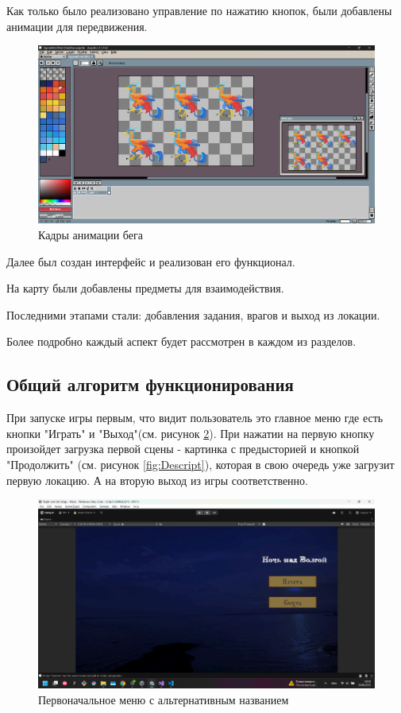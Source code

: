 \documentclass[bachelor, och, coursework, times]{SCWorks}
\begin{document}
    Как только было реализовано управление по нажатию кнопок, были добавлены 
    анимации для передвижения.

    \begin{figure} [H]
        \centering
    \includegraphics[width=0.50\linewidth]{Pictures/Снимок экрана 2025-06-24 162629.png}
    \caption{Кадры анимации бега}
    \label{fig:Run}
    \end{figure}
    
    Далее был создан интерфейс и реализован его функционал. 

    На карту были добавлены предметы для взаимодействия. 
    
    Последними этапами стали: добавления задания, врагов и выход из локации.

    Более подробно каждый аспект будет рассмотрен в каждом из разделов.

    \subsection{Общий алгоритм функционирования}

    При запуске игры первым, что видит пользователь это 
    главное меню где есть кнопки "Играть" и "Выход"(см. рисунок \ref{fig:MainMenu}). При нажатии на первую кнопку
    произойдет загрузка первой сцены - картинка с предысторией и кнопкой "Продолжить"
    (см. рисунок \ref{fig:Descript}),
     которая
    в свою очередь уже загрузит первую локацию. 
    А на вторую выход из игры соответственно. 

     \begin{figure} [H]
        \centering
    \includegraphics[width=0.50\linewidth]{Pictures/Снимок экрана 2025-06-24 205928.png}
    \caption{Первоначальное меню с альтернативным названием}
    \label{fig:MainMenu}
    \end{figure}
\end{document}

